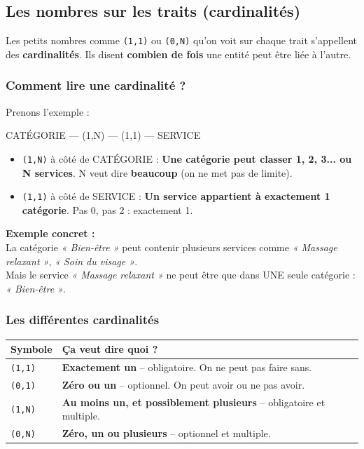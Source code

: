 \documentclass[12pt,a4paper]{article}
\begin{document}
\subsection{Les nombres sur les traits (cardinalités)}

Les petits nombres comme \texttt{(1,1)} ou \texttt{(0,N)} qu'on voit sur chaque trait s'appellent des \textbf{cardinalités}. Ils disent \textbf{combien de fois} une entité peut être liée à l'autre.

\subsubsection{Comment lire une cardinalité ?}

Prenons l'exemple :

CATÉGORIE --- (1,N) --- (1,1) --- SERVICE


\begin{itemize}
    \item \texttt{(1,N)} à côté de CATÉGORIE : \textbf{Une catégorie peut classer 1, 2, 3... ou N services}. N veut dire \textbf{beaucoup} (on ne met pas de limite).
    \item \texttt{(1,1)} à côté de SERVICE : \textbf{Un service appartient à exactement 1 catégorie}. Pas 0, pas 2 : exactement 1.
\end{itemize}

\begin{exemplebox}
    \textbf{Exemple concret :} \\
    La catégorie \textit{« Bien-être »} peut contenir plusieurs services comme \textit{« Massage relaxant »}, \textit{« Soin du visage »}. \\
    Mais le service \textit{« Massage relaxant »} ne peut être que dans UNE seule catégorie : \textit{« Bien-être »}.
\end{exemplebox}

\subsubsection{Les différentes cardinalités}

\noindent\begin{tabularx}{\textwidth}{l X}
    \toprule
    \textbf{Symbole} & \textbf{Ça veut dire quoi ?} \\
    \midrule
    \texttt{(1,1)} & \textbf{Exactement un} -- obligatoire. On ne peut pas faire sans. \\
    \texttt{(0,1)} & \textbf{Zéro ou un} -- optionnel. On peut avoir ou ne pas avoir. \\
    \texttt{(1,N)} & \textbf{Au moins un, et possiblement plusieurs} -- obligatoire et multiple. \\
    \texttt{(0,N)} & \textbf{Zéro, un ou plusieurs} -- optionnel et multiple. \\
    \bottomrule
\end{tabularx}
\end{document}
